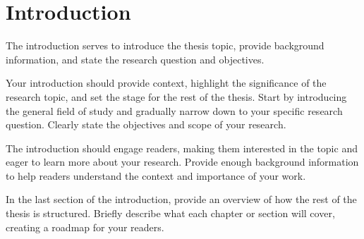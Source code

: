 \chapter{Introduction}

The introduction serves to introduce the thesis topic, provide background information, and state the research question and objectives.

Your introduction should provide context, highlight the significance of the research topic, and set the stage for the rest of the thesis. Start by introducing the general field of study and gradually narrow down to your specific research question. Clearly state the objectives and scope of your research.

The introduction should engage readers, making them interested in the topic and eager to learn more about your research. Provide enough background information to help readers understand the context and importance of your work.

In the last section of the introduction, provide an overview of how the rest of the thesis is structured. Briefly describe what each chapter or section will cover, creating a roadmap for your readers.

